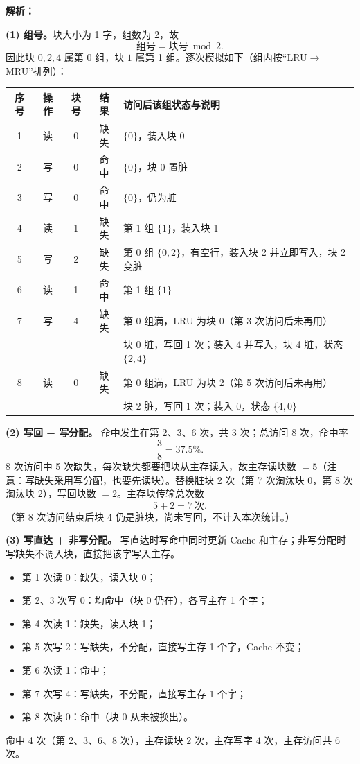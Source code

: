\begin{enumerate}[leftmargin=*]
\ifshowsolutions\par\noindent\textbf{解析：}

\textbf{(1) 组号。}块大小为 1 字，组数为 2，故
\[
\text{组号}=\text{块号}\bmod 2 .
\]
因此块 $0,2,4$ 属第 0 组，块 $1$ 属第 1 组。逐次模拟如下（组内按“LRU$\to$MRU”排列）：

\begin{center}
\small
\begin{tabular}{c|c|c|c|l}
\hline
序号 & 操作 & 块号 & 结果 & 访问后该组状态与说明\\
\hline
1 & 读 & 0 & 缺失 & $\{0\}$，装入块 0\\
2 & 写 & 0 & 命中 & $\{0\}$，块 0 置脏\\
3 & 写 & 0 & 命中 & $\{0\}$，仍为脏\\
4 & 读 & 1 & 缺失 & 第 1 组 $\{1\}$，装入块 1\\
5 & 写 & 2 & 缺失 & 第 0 组 $\{0,2\}$，有空行，装入块 2 并立即写入，块 2 变脏\\
6 & 读 & 1 & 命中 & 第 1 组 $\{1\}$\\
7 & 写 & 4 & 缺失 & 第 0 组满，LRU 为块 0（第 3 次访问后未再用）\\
  &   &   &      & 块 0 脏，写回 1 次；装入 4 并写入，块 4 脏，状态 $\{2,4\}$\\
8 & 读 & 0 & 缺失 & 第 0 组满，LRU 为块 2（第 5 次访问后未再用）\\
  &   &   &      & 块 2 脏，写回 1 次；装入 0，状态 $\{4,0\}$\\
\hline
\end{tabular}
\end{center}

\textbf{(2) 写回 + 写分配。}
命中发生在第 2、3、6 次，共 3 次；总访问 8 次，命中率
\[
\frac{3}{8}=37.5\%.
\]
8 次访问中 5 次缺失，每次缺失都要把块从主存读入，故主存读块数 $=5$（注意：写缺失采用写分配，也要先读块）。替换脏块 2 次（第 7 次淘汰块 0，第 8 次淘汰块 2），写回块数 $=2$。主存块传输总次数
\[
5+2=7\ \text{次}.
\]
（第 8 次访问结束后块 4 仍是脏块，尚未写回，不计入本次统计。）

\textbf{(3) 写直达 + 非写分配。}
写直达时写命中同时更新 Cache 和主存；非写分配时写缺失不调入块，直接把该字写入主存。
\begin{itemize}
    \item 第 1 次读 0：缺失，读入块 0；
    \item 第 2、3 次写 0：均命中（块 0 仍在），各写主存 1 个字；
    \item 第 4 次读 1：缺失，读入块 1；
    \item 第 5 次写 2：写缺失，不分配，直接写主存 1 个字，Cache 不变；
    \item 第 6 次读 1：命中；
    \item 第 7 次写 4：写缺失，不分配，直接写主存 1 个字；
    \item 第 8 次读 0：命中（块 0 从未被换出）。
\end{itemize}
命中 4 次（第 2、3、6、8 次），主存读块 $2$ 次，主存写字 $4$ 次，主存访问共 $6$ 次。


\end{enumerate}
